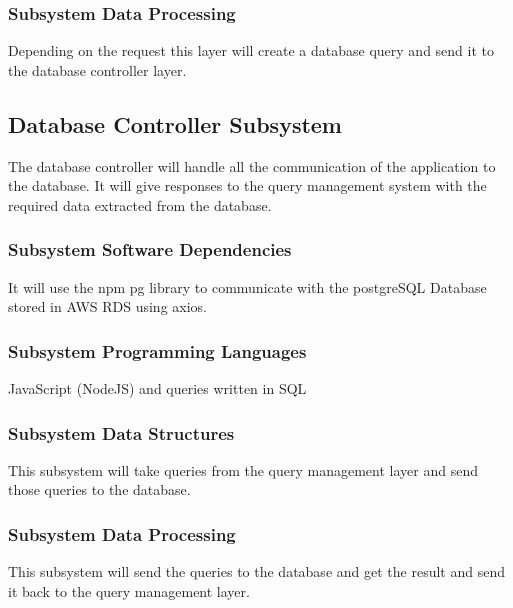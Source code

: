 \subsubsection{Subsystem Data Processing}
Depending on the request this layer will create a database query and send it to the database controller layer.

\subsection{Database Controller Subsystem}
The database controller will handle all the communication of the application to the database. It will
give responses to the query management system with the required data extracted from the database.



\subsubsection{Subsystem Software Dependencies}
It will use the npm pg library to communicate with the postgreSQL Database stored in AWS RDS using axios.

\subsubsection{Subsystem Programming Languages}
JavaScript (NodeJS) and queries written in SQL

\subsubsection{Subsystem Data Structures}
This subsystem will take queries from the query management layer and send those queries to the database.

\subsubsection{Subsystem Data Processing}
This subsystem will send the queries to the database and get the result and send it back to the query management layer.